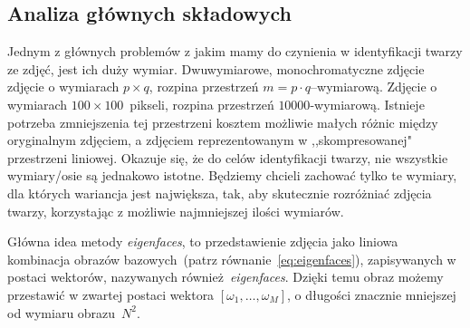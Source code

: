 \documentclass[a4paper,titlepage]{article}
\theoremstyle{break}
\numberwithin{equation}{subsection}
\begin{document}

\subsection{Analiza głównych składowych}

Jednym z głównych problemów z jakim mamy do czynienia w identyfikacji twarzy ze zdjęć, jest ich duży wymiar. Dwuwymiarowe, monochromatyczne zdjęcie zdjęcie o wymiarach $p\times q$, rozpina przestrzeń $m=p\cdot q$--wymiarową. Zdjęcie o wymiarach $100\times 100$~pikseli, rozpina przestrzeń $10000$-wymiarową. Istnieje potrzeba zmniejszenia tej przestrzeni kosztem możliwie małych różnic między oryginalnym zdjęciem, a zdjęciem reprezentowanym w ,,skompresowanej" przestrzeni liniowej. Okazuje się, że do celów identyfikacji twarzy, nie wszystkie wymiary/osie są jednakowo istotne. Będziemy chcieli zachować tylko te wymiary, dla których wariancja jest największa, tak, aby skutecznie rozróżniać zdjęcia twarzy, korzystając z możliwie najmniejszej ilości wymiarów\cite{www:opencv}.

Główna idea metody \emph{eigenfaces}, to przedstawienie zdjęcia jako liniowa kombinacja obrazów bazowych~(patrz równanie~\ref{eq:eigenfaces}), zapisywanych w postaci wektorów, nazywanych również~\emph{eigenfaces}. Dzięki temu obraz możemy przestawić w zwartej postaci wektora $[\omega_1,\dotsc,\omega_M]$, o długości znacznie mniejszej od wymiaru obrazu~$N^2$.
\end{document}
